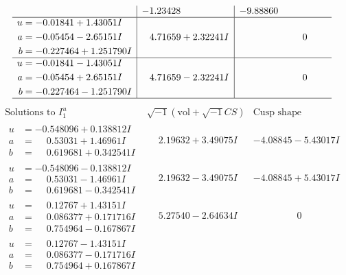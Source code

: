 \documentclass[1p]{elsarticle_modified}
\theoremstyle{definition}
\newcommand{\I}{\sqrt{-1}}
\begin{document}
$$\begin{array}{c|c|c}
 & -1.23428\phantom{ +0.000000I} & -9.88860\phantom{ +0.000000I} \\ \hline\begin{aligned}
u &= -0.01841 + 1.43051 I \\
a &= -0.05454 - 2.65151 I \\
b &= -0.227464 + 1.251790 I\end{aligned}
 & \phantom{-}4.71659 + 2.32241 I & \phantom{-0.000000 } 0 \\ \hline\begin{aligned}
u &= -0.01841 - 1.43051 I \\
a &= -0.05454 + 2.65151 I \\
b &= -0.227464 - 1.251790 I\end{aligned}
 & \phantom{-}4.71659 - 2.32241 I & \phantom{-0.000000 } 0\\
 \hline 
 \end{array}$$\newpage$$\begin{array}{c|c|c}  
\text{Solutions to }I^u_{1}& \I (\text{vol} + \sqrt{-1}CS) & \text{Cusp shape}\\
 \hline 
\begin{aligned}
u &= -0.548096 + 0.138812 I \\
a &= \phantom{-}0.53031 + 1.46961 I \\
b &= \phantom{-}0.619681 + 0.342541 I\end{aligned}
 & \phantom{-}2.19632 + 3.49075 I & -4.08845 - 5.43017 I \\ \hline\begin{aligned}
u &= -0.548096 - 0.138812 I \\
a &= \phantom{-}0.53031 - 1.46961 I \\
b &= \phantom{-}0.619681 - 0.342541 I\end{aligned}
 & \phantom{-}2.19632 - 3.49075 I & -4.08845 + 5.43017 I \\ \hline\begin{aligned}
u &= \phantom{-}0.12767 + 1.43151 I \\
a &= \phantom{-}0.086377 + 0.171716 I \\
b &= \phantom{-}0.754964 - 0.167867 I\end{aligned}
 & \phantom{-}5.27540 - 2.64634 I & \phantom{-0.000000 } 0 \\ \hline\begin{aligned}
u &= \phantom{-}0.12767 - 1.43151 I \\
a &= \phantom{-}0.086377 - 0.171716 I \\
b &= \phantom{-}0.754964 + 0.167867 I\end{aligned}

\end{array}$$
\end{document}
